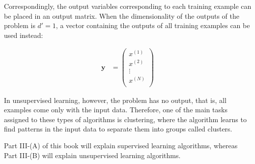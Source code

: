 Correspondingly, the output variables corresponding to each training example can be placed in an output matrix. When the dimensionality of the outputs of the problem is $d'=1$, a vector containing the outputs of all training examples can be used instead:

\begin{align}
    \mathbf{y} &= \begin{pmatrix}
           x^{(1)} \\
           x^{(2)} \\
           \vdots \\
		   x^{(N)} \\
         \end{pmatrix}
  \end{align}

In unsupervised learning, however, the problem has no output, that is, all examples come only with the input data. Therefore, one of the main tasks assigned to these types of algorithms is clustering, where the algorithm learns to find patterns in the input data to separate them into groups called clusters. 

Part III-(A) of this book will explain supervised learning algorithms, whereas Part III-(B) will explain unsupervised learning algorithms.




%
